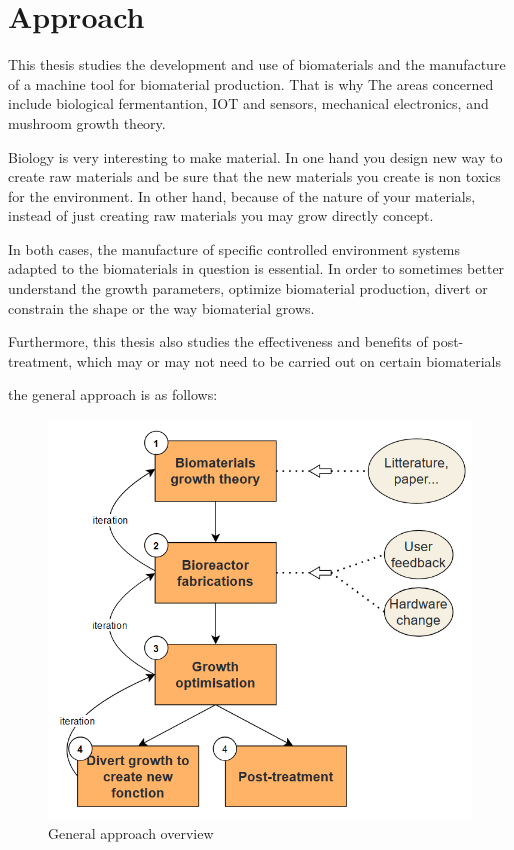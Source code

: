 \section{Approach}
This thesis studies the development and use of biomaterials and the manufacture of a machine tool for biomaterial production.
That is why The areas concerned include biological fermentantion, IOT and sensors, mechanical electronics, and mushroom growth theory. 

Biology is very interesting to make material. In one hand you design new way to create raw materials and be sure that the new materials you create is non toxics for the environment. In other hand, because of the nature of your materials, instead of just creating raw materials you may grow directly concept. 

In both cases, the manufacture of specific controlled environment systems adapted to the biomaterials in question is essential. 
In order to sometimes better understand the growth parameters, optimize biomaterial production, divert or constrain the shape or the way biomaterial grows. 

Furthermore, this thesis also studies the effectiveness and benefits of post-treatment, which may or may not need to be carried out on certain biomaterials 

the general approach is as follows: 

\begin{figure}[h]
    \centering
    \includegraphics{images/diag_approche.png}
    \caption{General approach overview}
    \label{fig:IS_demo}
\end{figure}


